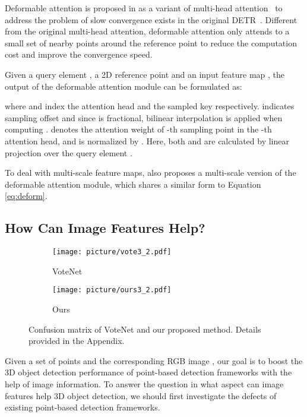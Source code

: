 \documentclass[runningheads]{llncs}
\begin{document}
Deformable attention is proposed in \cite{zhu2020deformable} as a variant of multi-head attention~\cite{vaswani2017attention} to address the problem of slow convergence exists in the original DETR~\cite{carion2020end}. Different from the original multi-head attention, deformable attention only attends to a small set of nearby points around the reference point to reduce the computation cost and improve the convergence speed.

Given a query element , a 2D reference point  and an input feature map , the output of the deformable attention module can be formulated as:

where  and  index the attention head and the sampled key respectively.  indicates sampling offset and since  is fractional, bilinear interpolation is applied when computing .  denotes the attention weight of -th sampling point in the -th attention head, and is normalized by . Here, both  and  are calculated by linear projection over the query element .

To deal with multi-scale feature maps, \cite{zhu2020deformable} also proposes a multi-scale version of the deformable attention module, which shares a similar form to Equation \ref{eq:deform}.

\subsection{How Can Image Features Help?}

\vspace{-6pt}
\begin{figure}
\begin{subfigure}{0.47\textwidth}
    \texttt{[image: picture/vote3\_2.pdf]}
    \caption{VoteNet}
    \label{fig:convote}
\end{subfigure}
\begin{subfigure}{0.47\textwidth}
    \centering
    \texttt{[image: picture/ours3\_2.pdf]}
    \caption{Ours}
    \label{fig:conour}
\end{subfigure}
\caption{Confusion matrix of VoteNet and our proposed method. Details provided in the Appendix.}
\label{fig:confusion}
\end{figure}

Given a set of  points  and the corresponding RGB image , our goal is to boost the 3D object detection performance of point-based detection frameworks with the help of image information. To answer the question in what aspect can image features help 3D object detection, we should first investigate the defects of existing point-based detection frameworks.
\end{document}
